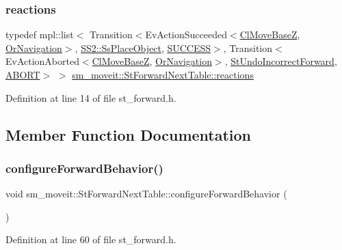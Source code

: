 \subsubsection{\texorpdfstring{reactions}{reactions}}
{\footnotesize\ttfamily typedef mpl\+::list$<$ Transition$<$Ev\+Action\+Succeeded$<$\hyperlink{classcl__move__base__z_1_1ClMoveBaseZ}{Cl\+Move\+BaseZ}, \hyperlink{classsm__moveit_1_1OrNavigation}{Or\+Navigation}$>$, \hyperlink{structsm__moveit_1_1SS2_1_1SsPlaceObject}{S\+S2\+::\+Ss\+Place\+Object}, \hyperlink{classSUCCESS}{S\+U\+C\+C\+E\+SS}$>$, Transition$<$Ev\+Action\+Aborted$<$\hyperlink{classcl__move__base__z_1_1ClMoveBaseZ}{Cl\+Move\+BaseZ}, \hyperlink{classsm__moveit_1_1OrNavigation}{Or\+Navigation}$>$, \hyperlink{structsm__moveit_1_1StUndoIncorrectForward}{St\+Undo\+Incorrect\+Forward}, \hyperlink{classABORT}{A\+B\+O\+RT}$>$ $>$ \hyperlink{structsm__moveit_1_1StForwardNextTable_a00ed94e86d9c85581a167cfdf8e9dbfe}{sm\+\_\+moveit\+::\+St\+Forward\+Next\+Table\+::reactions}}



Definition at line 14 of file st\+\_\+forward.\+h.



\subsection{Member Function Documentation}
\mbox{\label{structsm__moveit_1_1StForwardNextTable_a6ecfa1c16ac130f4063cea5a90325b66}} 
\subsubsection{\texorpdfstring{configure\+Forward\+Behavior()}{configureForwardBehavior()}}
{\footnotesize\ttfamily void sm\+\_\+moveit\+::\+St\+Forward\+Next\+Table\+::configure\+Forward\+Behavior (\begin{DoxyParamCaption}{ }\end{DoxyParamCaption})\hspace{0.3cm}{\ttfamily [inline]}}



Definition at line 60 of file st\+\_\+forward.\+h.



